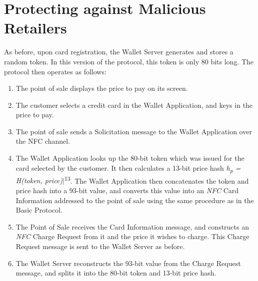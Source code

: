 \section{Protecting against Malicious Retailers}
\label{unlinkable-design-2}

As before, upon card registration, the Wallet Server generates and stores a random token.
In this version of the protocol, this token is only 80 bits long.
The protocol then operates as follows:

\begin{enumerate}
    \item The point of sale displays the price to pay on its screen.
    \item The customer selects a credit card in the Wallet Application, and keys in the price to pay.
    \item The point of sale sends a Solicitation message to the Wallet Application over the NFC channel.
    \item The Wallet Application looks up the 80-bit token which was issued for the card selected by the customer.
        It then calculates a 13-bit price hash \emph{h\textsubscript{p} = H(token, price)}$|$\textsuperscript{13}.
        The Wallet Application then concatenates the token and price hash into a 93-bit value,
        and converts this value into an \emph{NFC} Card Information addressed to the point of sale using the same procedure as in the Basic Protocol.
    \item The Point of Sale receives the Card Information message, and constructs an \emph{NFC} Charge Request from it and the price it wishes to charge.
        This Charge Request message is sent to the Wallet Server as before.
    \item The Wallet Server reconstructs the 93-bit value from the Charge Request message, and splits it into the 80-bit token and 13-bit price hash.
\end{enumerate}